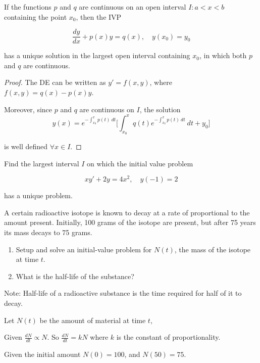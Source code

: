 \begin{theorem}
    If the functions $p$ and $q$ are continuous on an open interval $I: a < x < b$ containing the 
    point $x_0$, then the IVP 

    \begin{equation}
        \frac{dy}{dx} + p(x) y = q(x), \quad y(x_0) = y_0
    \end{equation}

    has a unique solution in the largest open interval containing $x_0$, in which both $p$ and $q$ 
    are continuous.

\end{theorem}
\begin{proof}
    The DE can be written as $y' = f(x,y)$, where $f(x,y) = q(x) - p(x)y$. 

    Moreover, since $p$ and $q$ are continuous on $I$, the solution 
    \begin{equation}
        y(x) = e^{-\int^x_{x_0} p(t)\> dt} \biggl[\int_{x_0}^{x} q(t) e^{-\int^x_{x_0} p(t)\> dt} \> dt + y_0  \biggr]
    \end{equation}

    is well defined $\forall x \in I$.
\end{proof}

\begin{example}
    Find the largest interval $I$ on which the initial value problem

    \[
        xy' + 2y = 4x^2, \quad y(-1) = 2
    \]

    has a unique problem.
\end{example}

\begin{example}
    A certain radioactive isotope is known to decay at a rate of proportional to the amount present.
    Initially, 100 grams of the isotope are present, but after 75 years its mass decays to 75 grams.

    \begin{enumerate}
        \item Setup and solve an initial-value problem for $N(t)$, the mass of the isotope at time $t$.
        \item What is the half-life of the substance?
    \end{enumerate}

    Note: Half-life of a radioactive substance is the time required for half of it to decay.
\end{example}
\begin{solution}
    Let $N(t)$ be the amount of material at time $t$,

    Given $\displaystyle \frac{dN}{dt} \propto N$. So $\displaystyle \frac{dN}{dt} = kN$ 
    where $k$ is the constant of proportionality. 
    
    Given the initial amount $N(0) = 100$, and $N(50) = 75$.
\end{solution}

